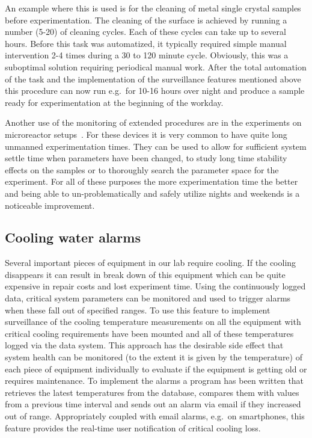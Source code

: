 An example where this is used is for the cleaning of metal single crystal
samples before experimentation. The cleaning of the surface is achieved by
running a number (5-20) of cleaning cycles. Each of these cycles can take up to
several hours. Before this task was automatized, it typically required simple
manual intervention 2-4 times during a 30 to 120 minute cycle. Obviously, this
was a suboptimal solution requiring periodical manual work. After
the total automation of the task and the implementation of the surveillance
features mentioned above this procedure can now run e.g.\ for 10-16 hours over
night and produce a sample ready for experimentation at the beginning of the
workday.

Another use of the monitoring of extended procedures are in the experiments on
microreactor setups~\cite{Henriksen2009}. For these devices it is very common
to have quite long unmanned experimentation times. They can be used to allow
for sufficient system settle time when parameters have been changed, to study
long time stability effects on the samples or to thoroughly search the
parameter space for the experiment. For all of these purposes the more
experimentation time the better and being able to un-problematically and safely
utilize nights and weekends is a noticeable improvement.

\subsection{Cooling water alarms}\label{sec:cooling_water_alarms}
Several important pieces of equipment in our lab require cooling. If the
cooling disappears it can result in break down of this equipment which can
be quite expensive in repair costs and lost experiment time. Using the
continuously logged data, critical system parameters can be monitored and used
to trigger alarms when these fall out of specified ranges. To use this feature
to implement surveillance of the cooling temperature measurements on all the
equipment with critical cooling requirements have been mounted and all of these
temperatures logged via the data system. This approach has the desirable side
effect that system health can be monitored (to the extent it is given by the
temperature) of each piece of equipment individually to evaluate if the
equipment is getting old or requires maintenance. To implement the alarms a
program has been written that retrieves the latest temperatures from the
database, compares them with values from a previous time interval and sends out
an alarm via email if they increased out of range. Appropriately coupled with
email alarms, e.g.\ on smartphones, this feature provides the real-time user
notification of critical cooling loss.
